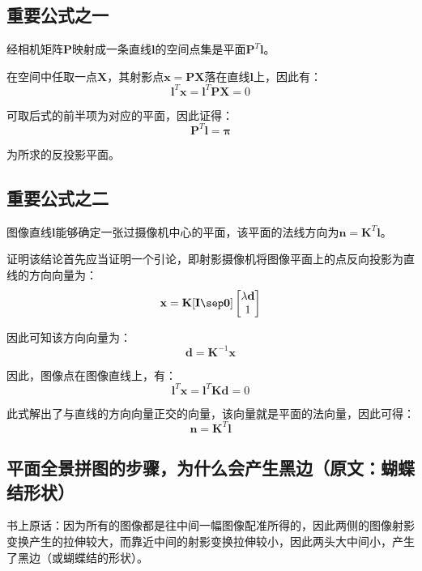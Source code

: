 \documentclass[11pt]{article}
\begin{document}
\subsection{重要公式之一}
{\heiti 经相机矩阵$\mathbf{P}$映射成一条直线$\mathbf{l}$的空间点集是平面$\mathbf{P}^T\mathbf{l}$}。\par
{}\par
在空间中任取一点$\mathbf{X}$，其射影点$\mathbf{x=PX}$落在直线$\mathbf{l}$上，因此有：
\begin{equation*}
  \mathbf{l}^T\mathbf{x}=\mathbf{l}^T\mathbf{PX}=0
\end{equation*}\par
可取后式的前半项为对应的平面，因此证得：
\begin{equation*}
  \mathbf{P}^T\mathbf{l}=\mathbold{\pi}
\end{equation*}\par
为所求的反投影平面。
\subsection{重要公式之二}
{\heiti 图像直线$\mathbf{l}$能够确定一张过摄像机中心的平面，该平面的法线方向为$\mathbf{n=K^\mathit{T}l}$}。\par
{}\par
证明该结论首先应当证明一个引论，即射影摄像机将图像平面上的点反向投影为直线的方向向量为：
\begin{equation*}
  \mathbf{x}=\mathbf{K[I\sep 0]}\begin{bmatrix}
    \lambda\mathbf{d} \\1
  \end{bmatrix}
\end{equation*}\par
因此可知该方向向量为：
\begin{equation*}
  \mathbf{d}=\mathbf{K}^{-1}\mathbf{x}
\end{equation*}\par
因此，图像点在图像直线上，有：
\begin{equation*}
  \mathbf{l^\mathit{T}x}=\mathbf{l^\mathit{T}K}\mathbf{d}=0
\end{equation*}\par
此式解出了与直线的方向向量正交的向量，该向量就是平面的法向量，因此可得：
\begin{equation*}
  \mathbf{n}=\mathbf{K}^T\mathbf{l}
\end{equation*}\par
\subsection{平面全景拼图的步骤，为什么会产生黑边（原文：蝴蝶结形状）}
书上原话：因为所有的图像都是往中间一幅图像配准所得的，因此两侧的图像射影变换产生的拉伸较大，而靠近中间的射影变换拉伸较小，因此两头大中间小，产生了黑边（或蝴蝶结的形状）。
\end{document}
